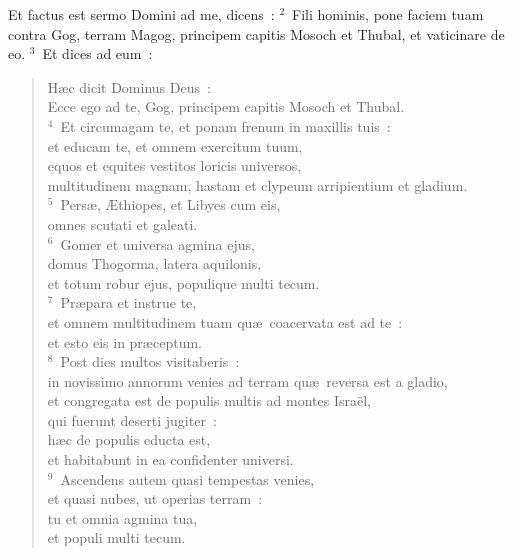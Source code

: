 \bchapter
\lettrine[lines=3,image=true,loversize=0.05,lraise=-0.03]{E}{}t factus est sermo Domini ad me, dicens~:
${}^{2}$~Fili hominis, pone faciem tuam contra Gog, terram Magog, principem capitis Mosoch et Thubal, et vaticinare de eo.
${}^{3}$~Et dices ad eum~: \begin{flushleft}\begin{verse}H\ae c dicit Dominus Deus~:\\ Ecce ego ad te, Gog, principem capitis Mosoch et Thubal.\\
${}^{4}$~Et circumagam te, et ponam frenum in maxillis tuis~:\\ et educam te, et omnem exercitum tuum,\\ equos et equites vestitos loricis universos,\\ multitudinem magnam, hastam et clypeum arripientium et gladium.\\
${}^{5}$~Pers\ae , \AE thiopes, et Libyes cum eis,\\ omnes scutati et galeati.\\
${}^{6}$~Gomer et universa agmina ejus,\\ domus Thogorma, latera aquilonis,\\ et totum robur ejus, populique multi tecum.\\
${}^{7}$~Pr\ae para et instrue te,\\ et omnem multitudinem tuam qu\ae\ coacervata est ad te~:\\ et esto eis in pr\ae ceptum.\\
${}^{8}$~Post dies multos visitaberis~:\\ in novissimo annorum venies ad terram qu\ae\ reversa est a gladio,\\ et congregata est de populis multis ad montes Isra\"el,\\ qui fuerunt deserti jugiter~:\\ h\ae c de populis educta est,\\ et habitabunt in ea confidenter universi.\\
${}^{9}$~Ascendens autem quasi tempestas venies,\\ et quasi nubes, ut operias terram~:\\ tu et omnia agmina tua,\\ et populi multi tecum.\end{verse}\end{flushleft}


